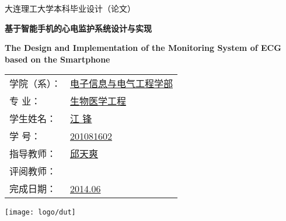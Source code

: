\thispagestyle{cover}

\vspace{80pt}

\begin{center}
     \songti%
    大连理工大学本科毕业设计（论文）
\end{center}

\vskip 40pt

\begin{center}
     \bfseries\songti%
    基于智能手机的心电监护系统设计与实现
\end{center}

\begin{center}
     \bfseries\songti%
    The Design and Implementation of the Monitoring System of ECG based on the Smartphone
\end{center}

\vskip 180pt

\begin{center}
    \begin{tabularx}{.6\textwidth}{>{\fangsong}l >{\fangsong}X<{\centering}}
        学院（系）： & \uline{\hfill 电子信息与电气工程学部 \hfill} \\
        专{\quad} {\quad}业：   & \uline{\hfill 生物医学工程 \hfill} \\
        学生姓名：   &  \uline{\hfill 江{\quad} 锋 \hfill} \\
        学{\quad} {\quad}号：   &  \uline{\hfill 201081602 \hfill} \\
        指导教师：   &  \uline{\hfill 邱天爽 \hfill} \\
        评阅教师：   &  \uline{\hfill  \hfill} \\
        完成日期：   &  \uline{\hfill 2014.06 \hfill} \\
    \end{tabularx}
\end{center}

\vskip 40pt

\begin{center}
    \texttt{[image: logo/dut]}
\end{center}
